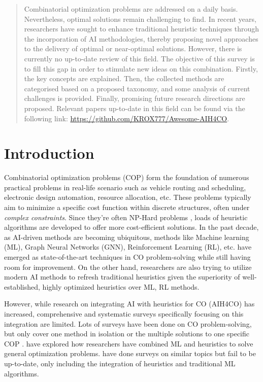 \documentclass[a4paper]{article}
\begin{document}


\begin{abstract}
Combinatorial optimization problems are addressed on a daily basis. Nevertheless, optimal solutions remain challenging to find. In recent years, researchers have sought to enhance traditional heuristic techniques through the incorporation of AI methodologies, thereby proposing novel approaches to the delivery of optimal or near-optimal solutions. However, there is currently no up-to-date review of this field. The objective of this survey is to fill this gap in order to stimulate new ideas on this combination. Firstly, the key concepts are explained. Then, the collected methods are categorised based on a proposed taxonomy, and some analysis of current challenges is provided. Finally, promising future research directions are proposed. Relevant papers up-to-date in this field can be found via the following link: \url{https://github.com/KROX777/Awesome-AIH4CO}.
\end{abstract}

\section{Introduction} %
Combinatorial optimization problems (COP) form the foundation of numerous practical problems in real-life scenario such as vehicle routing and scheduling, electronic design automation, resource allocation, etc. These problems typically aim to minimize a specific cost function within discrete structures, often under \textit{complex constraints}. Since they're often NP-Hard problems \citep{Karp}, loads of heuristic \citep{Boussaïd,Farhi} algorithms are developed to offer more cost-efficient solutions. In the past decade, as AI-driven methods are becoming ubiquitous, methods like Machine learning (ML), Graph Neural Networks (GNN), Reinforcement Learning (RL), etc. have emerged as state-of-the-art techniques in CO problem-solving while still having room for improvement. On the other hand, researchers are also trying to utilize modern AI methods to refresh traditional heuristics given the superiority of well-established, highly optimized heuristics over ML, RL methods. \citep{darvariu}

However, while research on integrating AI with heuristics for CO (AIH4CO) has increased, comprehensive and systematic surveys specifically focusing on this integration are limited. Lots of surveys have been done on CO problem-solving, but only cover one method in isolation \citep{Boussaïd,Quentin} or the multiple solutions to one specific COP \citep{Zhang}. \citet{Talbi} have explored how researchers have combined ML and heuristics to solve general optimization problems. \citet{Maryam,dosSantos2014} have done surveys on similar topics but fail to be up-to-date, only including the integration of heuristics and traditional ML algorithms. 
\end{document}

